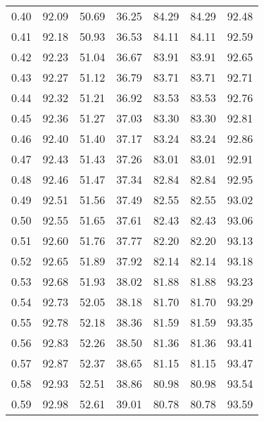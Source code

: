 \begin{tabular}{|c|c|c|c|c|c|c|}
      0.40 &     92.09 &     50.69 &      36.25 &   84.29 &      84.29 &         92.48 \\
      0.41 &     92.18 &     50.93 &      36.53 &   84.11 &      84.11 &         92.59 \\
      0.42 &     92.23 &     51.04 &      36.67 &   83.91 &      83.91 &         92.65 \\
      0.43 &     92.27 &     51.12 &      36.79 &   83.71 &      83.71 &         92.71 \\
      0.44 &     92.32 &     51.21 &      36.92 &   83.53 &      83.53 &         92.76 \\
      0.45 &     92.36 &     51.27 &      37.03 &   83.30 &      83.30 &         92.81 \\
      0.46 &     92.40 &     51.40 &      37.17 &   83.24 &      83.24 &         92.86 \\
      0.47 &     92.43 &     51.43 &      37.26 &   83.01 &      83.01 &         92.91 \\
      0.48 &     92.46 &     51.47 &      37.34 &   82.84 &      82.84 &         92.95 \\
      0.49 &     92.51 &     51.56 &      37.49 &   82.55 &      82.55 &         93.02 \\
      0.50 &     92.55 &     51.65 &      37.61 &   82.43 &      82.43 &         93.06 \\
      0.51 &     92.60 &     51.76 &      37.77 &   82.20 &      82.20 &         93.13 \\
      0.52 &     92.65 &     51.89 &      37.92 &   82.14 &      82.14 &         93.18 \\
      0.53 &     92.68 &     51.93 &      38.02 &   81.88 &      81.88 &         93.23 \\
      0.54 &     92.73 &     52.05 &      38.18 &   81.70 &      81.70 &         93.29 \\
      0.55 &     92.78 &     52.18 &      38.36 &   81.59 &      81.59 &         93.35 \\
      0.56 &     92.83 &     52.26 &      38.50 &   81.36 &      81.36 &         93.41 \\
      0.57 &     92.87 &     52.37 &      38.65 &   81.15 &      81.15 &         93.47 \\
      0.58 &     92.93 &     52.51 &      38.86 &   80.98 &      80.98 &         93.54 \\
      0.59 &     92.98 &     52.61 &      39.01 &   80.78 &      80.78 &         93.59 \\

\end{tabular}
